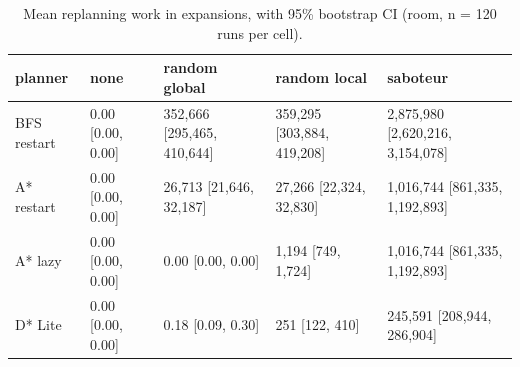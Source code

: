 \begin{table}[t]
\centering
\small
\caption{Mean replanning work in expansions, with 95\% bootstrap CI (room, n = 120 runs per cell).}
\label{tab:replan-room}
\begin{tabular}{lllll}
\toprule
planner & none & random global & random local & saboteur \\
\midrule
BFS restart & 0.00 [0.00, 0.00] & 352,666 [295,465, 410,644] & 359,295 [303,884, 419,208] & 2,875,980 [2,620,216, 3,154,078] \\
A* restart & 0.00 [0.00, 0.00] & 26,713 [21,646, 32,187] & 27,266 [22,324, 32,830] & 1,016,744 [861,335, 1,192,893] \\
A* lazy & 0.00 [0.00, 0.00] & 0.00 [0.00, 0.00] & 1,194 [749, 1,724] & 1,016,744 [861,335, 1,192,893] \\
D* Lite & 0.00 [0.00, 0.00] & 0.18 [0.09, 0.30] & 251 [122, 410] & 245,591 [208,944, 286,904] \\
\bottomrule
\end{tabular}
\end{table}
